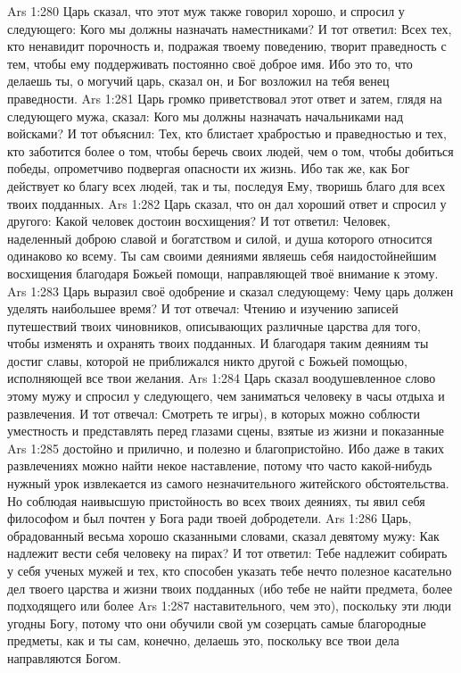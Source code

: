\vs Ars 1:280
Царь сказал, что этот муж также говорил хорошо, и спросил у следующего: Кого мы должны назначать наместниками? И тот ответил: Всех тех, кто ненавидит порочность и, подражая твоему поведению, творит праведность с тем, чтобы ему поддерживать постоянно своё доброе имя. Ибо это то, что делаешь ты, о могучий царь, сказал он, и Бог возложил на тебя венец праведности.
\vs Ars 1:281
Царь громко приветствовал этот ответ и затем, глядя на следующего мужа, сказал: Кого мы должны назначать начальниками над войсками? И тот объяснил: Тех, кто блистает храбростью и праведностью и тех, кто заботится более о том, чтобы беречь своих людей, чем о том, чтобы добиться победы, опрометчиво подвергая опасности их жизнь. Ибо так же, как Бог действует ко благу всех людей, так и ты, последуя Ему, творишь благо для всех твоих подданных.
\vs Ars 1:282
Царь сказал, что он дал хороший ответ и спросил у другого: Какой человек достоин восхищения? И тот ответил: Человек, наделенный доброю славой и богатством и силой, и душа которого относится одинаково ко всему. Ты сам своими деяниями являешь себя наидостойнейшим восхищения благодаря Божьей помощи, направляющей твоё внимание к этому.
\vs Ars 1:283
Царь выразил своё одобрение и сказал следующему: Чему царь должен уделять наибольшее время? И тот отвечал: Чтению и изучению записей путешествий твоих чиновников, описывающих различные царства для того, чтобы изменять и охранять твоих подданных. И благодаря таким деяниям ты достиг славы, которой не приближался никто другой с Божьей помощью, исполняющей все твои желания.
\vs Ars 1:284
Царь сказал воодушевленное слово этому мужу и спросил у следующего, чем заниматься человеку в часы отдыха и развлечения. И тот отвечал: Смотреть те игры), в которых можно соблюсти уместность и представлять перед глазами сцены, взятые из жизни и показанные
\vs Ars 1:285
достойно и прилично, и полезно и благопристойно. Ибо даже в таких развлечениях можно найти некое наставление, потому что часто какой-нибудь нужный урок извлекается из самого незначительного житейского обстоятельства. Но соблюдая наивысшую пристойность во всех твоих деяниях, ты явил себя философом и был почтен у Бога ради твоей добродетели.
\vs Ars 1:286
Царь, обрадованный весьма хорошо сказанными словами, сказал девятому мужу: Как надлежит вести себя человеку на пирах? И тот ответил: Тебе надлежит собирать у себя ученых мужей и тех, кто способен указать тебе нечто полезное касательно дел твоего царства и жизни твоих подданных (ибо тебе не найти предмета, более подходящего или более
\vs Ars 1:287
наставительного, чем это), поскольку эти люди угодны Богу, потому что они обучили свой ум созерцать самые благородные предметы, как и ты сам, конечно, делаешь это, поскольку все твои дела направляются Богом.
